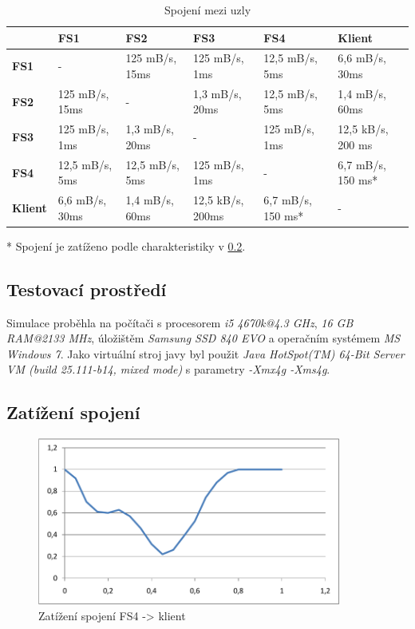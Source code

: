 \documentclass[czech,DP]{thesiskiv}
\begin{document}
\begin{table}
\centering
\caption{Spojení mezi uzly}
\label{table:uzlyspojeni}
\begin{adjustbox}{max width=\textwidth}
\begin{tabular}{|l|l|l|l|l|l|}
\hline
\textbf{}       & \textbf{FS1}   & \textbf{FS2}   & \textbf{FS3}     & \textbf{FS4}     & \textbf{Klient}   \\ \hline
\textbf{FS1}    & -              & 125 mB/s, 15ms & 125 mB/s, 1ms    & 12,5 mB/s, 5ms   & 6,6 mB/s, 30ms    \\ \hline
\textbf{FS2}    & 125 mB/s, 15ms & -              & 1,3 mB/s, 20ms   & 12,5 mB/s, 5ms   & 1,4 mB/s, 60ms    \\ \hline
\textbf{FS3}    & 125 mB/s, 1ms  & 1,3 mB/s, 20ms & -                & 125 mB/s, 1ms    & 12,5 kB/s, 200 ms \\ \hline
\textbf{FS4}    & 12,5 mB/s, 5ms & 12,5 mB/s, 5ms & 125 mB/s, 1ms    & -                & 6,7 mB/s, 150 ms*  \\ \hline
\textbf{Klient} & 6,6 mB/s, 30ms & 1,4 mB/s, 60ms & 12,5 kB/s, 200ms & 6,7 mB/s, 150 ms* & -                 \\ \hline
\end{tabular}
\end{adjustbox}
\raggedright{* Spojení je zatíženo podle charakteristiky v \ref{testzatizenispojeni}.}
\end{table}

\subsection{Testovací prostředí}

Simulace proběhla na počítači s procesorem \textit{i5 4670k@4.3 GHz}, \textit{16 GB RAM@2133 MHz}, úložištěm \textit{Samsung SSD 840 EVO} a operačním systémem \textit{MS Windows 7}. Jako virtuální stroj javy byl použit \textit{Java HotSpot(TM) 64-Bit Server VM (build 25.111-b14, mixed mode)} s parametry \textit{-Xmx4g -Xms4g}. 

\subsection{Zatížení spojení}\label{testzatizenispojeni}

\begin{figure}
\centering
	\includegraphics[width=100mm]{img/test/zatizeni.pdf}
\caption{Zatížení spojení FS4 -> klient}
\label{fig:test_zatizeni_spojeni}
\end{figure}
\end{document}
